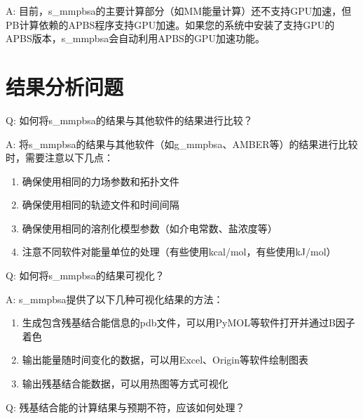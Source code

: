 \documentclass[letterpaper,10pt,english]{sphinxmanual}
\begin{document}
\sphinxAtStartPar
A: 目前，s\_mmpbsa的主要计算部分（如MM能量计算）还不支持GPU加速，但PB计算依赖的APBS程序支持GPU加速。如果您的系统中安装了支持GPU的APBS版本，s\_mmpbsa会自动利用APBS的GPU加速功能。


\section{结果分析问题}
\label{\detokenize{faq:id5}}
\sphinxAtStartPar
Q: 如何将s\_mmpbsa的结果与其他软件的结果进行比较？

\sphinxAtStartPar
A: 将s\_mmpbsa的结果与其他软件（如g\_mmpbsa、AMBER等）的结果进行比较时，需要注意以下几点：
\begin{enumerate}
%
\item {} 
\sphinxAtStartPar
确保使用相同的力场参数和拓扑文件

\item {} 
\sphinxAtStartPar
确保使用相同的轨迹文件和时间间隔

\item {} 
\sphinxAtStartPar
确保使用相同的溶剂化模型参数（如介电常数、盐浓度等）

\item {} 
\sphinxAtStartPar
注意不同软件对能量单位的处理（有些使用kcal/mol，有些使用kJ/mol）

\end{enumerate}

\sphinxAtStartPar
Q: 如何将s\_mmpbsa的结果可视化？

\sphinxAtStartPar
A: s\_mmpbsa提供了以下几种可视化结果的方法：
\begin{enumerate}
%
\item {} 
\sphinxAtStartPar
生成包含残基结合能信息的pdb文件，可以用PyMOL等软件打开并通过B因子着色

\item {} 
\sphinxAtStartPar
输出能量随时间变化的数据，可以用Excel、Origin等软件绘制图表

\item {} 
\sphinxAtStartPar
输出残基结合能数据，可以用热图等方式可视化

\end{enumerate}

\sphinxAtStartPar
Q: 残基结合能的计算结果与预期不符，应该如何处理？
\end{document}
